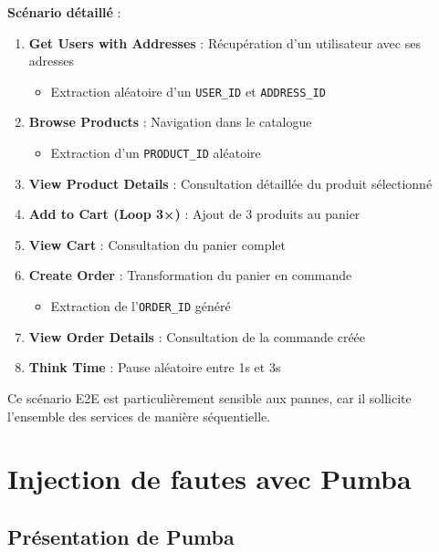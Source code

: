 \textbf{Scénario détaillé} :
\begin{enumerate}
    \item \textbf{Get Users with Addresses} : Récupération d'un utilisateur avec ses adresses
    \begin{itemize}
        \item Extraction aléatoire d'un \texttt{USER\_ID} et \texttt{ADDRESS\_ID}
    \end{itemize}
    
    \item \textbf{Browse Products} : Navigation dans le catalogue
    \begin{itemize}
        \item Extraction d'un \texttt{PRODUCT\_ID} aléatoire
    \end{itemize}
    
    \item \textbf{View Product Details} : Consultation détaillée du produit sélectionné
    
    \item \textbf{Add to Cart (Loop 3×)} : Ajout de 3 produits au panier
    
    \item \textbf{View Cart} : Consultation du panier complet
    
    \item \textbf{Create Order} : Transformation du panier en commande
    \begin{itemize}
        \item Extraction de l'\texttt{ORDER\_ID} généré
    \end{itemize}
    
    \item \textbf{View Order Details} : Consultation de la commande créée
    
    \item \textbf{Think Time} : Pause aléatoire entre 1s et 3s
\end{enumerate}

Ce scénario E2E est particulièrement sensible aux pannes, car il sollicite l'ensemble des services de manière séquentielle.



\section{Injection de fautes avec Pumba}

\subsection{Présentation de Pumba}

